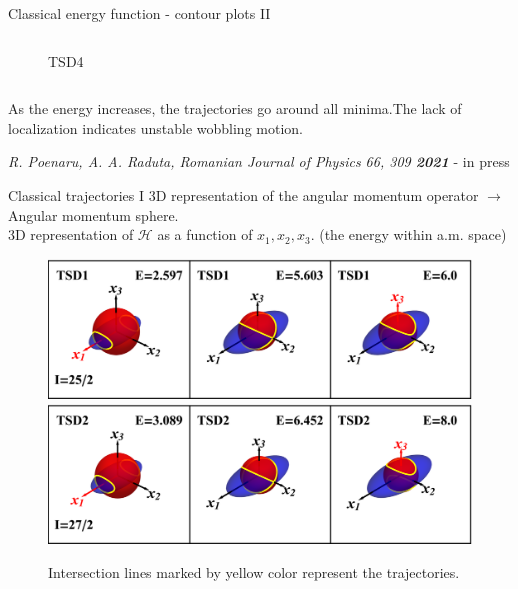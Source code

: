 \documentclass{beamer}
\begin{document}
\begin{frame}{Classical energy function - contour plots II}
\begin{columns}
\begin{figure}
    \caption{TSD4}
\end{figure}
\end{columns}
As the energy increases, the trajectories go around all minima.The lack of localization indicates unstable wobbling motion. 

\footnotesize{\textit{R. Poenaru, A. A. Raduta, Romanian Journal of Physics 66, 309 \textbf{2021}} - in press}
\end{frame}

\begin{frame}{Classical trajectories I}
3D representation of the angular momentum operator $\to$ Angular momentum sphere.\\
3D representation of $\mathcal{H}$ as a function of $x_1, x_2, x_3$. (the energy within a.m. space)
\begin{figure}
    \centering
    \includegraphics[scale=0.45]{figs/tsd1_spin1.eps}
    \includegraphics[scale=0.45]{figs/tsd2_spin1.eps}
    \caption{Intersection lines marked by yellow color represent the trajectories.}
\end{figure}
\end{frame}
\end{document}

